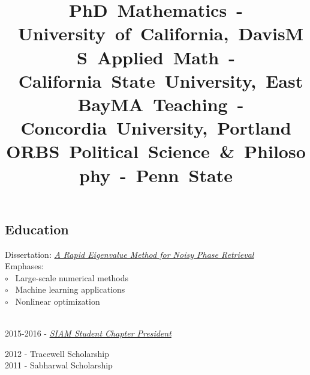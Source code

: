 \documentclass[12pt,margintitle,line]{res}
\begin{document}
\begin{resume}


\vspace{-1.3cm}

\section{Education}

\vspace{-0.5cm}
\title{\mbox{PhD  Mathematics - University of California, Davis}}
\dates{}
\begin{position}
Dissertation: 
\href{https://github.com/Will-Wright/dissertation-rapid_eigenvalue_method_for_noisy_phase_retrieval/blob/master/will_wright_dissertation.pdf} {\textsl{A Rapid Eigenvalue Method for Noisy Phase Retrieval}}
	\\
Emphases: 
	\\
$\circ$ \ Large-scale numerical methods
	\\
$\circ$ \ Machine learning applications 
	\\
$\circ$ \ Nonlinear optimization
\end{position}
\\
2015-2016 - \href{http://siam.math.ucdavis.edu/doku.php}{\textsl{SIAM Student Chapter President}}


\vspace{-0.75cm}
\title{\mbox{MS  Applied Math - California State University, East Bay}}
\dates{}
\begin{position}
2012 - Tracewell Scholarship
	\\
2011 - Sabharwal Scholarship
\end{position}


\vspace{-0.75cm}
\title{\mbox{MA Teaching - Concordia University, Portland OR}}
\dates{}
\begin{position}
\end{position}


\vspace{-1.8cm}
\title{\mbox{BS  Political Science \& Philosophy - Penn State}}
\dates{}
\begin{position}
\end{position}








\end{resume}
\end{document}
